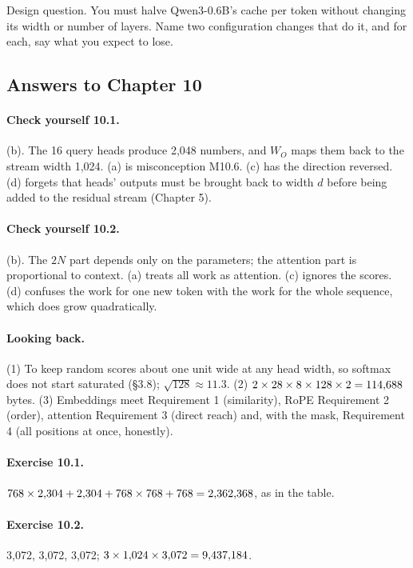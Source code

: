 \begin{exercise}
Design question. You must halve Qwen3-0.6B's cache per token without changing its width or number of layers. Name two
configuration changes that do it, and for each, say what you expect to lose.
\end{exercise}

\subsection*{Answers to Chapter 10}

\paragraph{Check yourself 10.1.} (b). The 16 query heads produce 2{,}048 numbers, and $W_O$ maps them back to the stream
width 1{,}024. (a) is misconception M10.6. (c) has the direction reversed. (d) forgets that heads' outputs must be
brought back to width $d$ before being added to the residual stream (Chapter 5).

\paragraph{Check yourself 10.2.} (b). The $2N$ part depends only on the parameters; the attention part is proportional
to context. (a) treats all work as attention. (c) ignores the scores. (d) confuses the work for one new token with the
work for the whole sequence, which does grow quadratically.

\paragraph{Looking back.} (1) To keep random scores about one unit wide at any head width, so softmax does not start
saturated (\S3.8); $\sqrt{128}\approx11.3$. (2) $2\times28\times8\times128\times2 = 114{,}688$ bytes. (3) Embeddings
meet Requirement 1 (similarity), RoPE Requirement 2 (order), attention Requirement 3 (direct reach) and, with the mask,
Requirement 4 (all positions at once, honestly).

\paragraph{Exercise 10.1.} $768\times2{,}304 + 2{,}304 + 768\times768 + 768 = 2{,}362{,}368$, as in the table.

\paragraph{Exercise 10.2.} 3{,}072, 3{,}072, 3{,}072; $3\times1{,}024\times3{,}072 = 9{,}437{,}184$.

